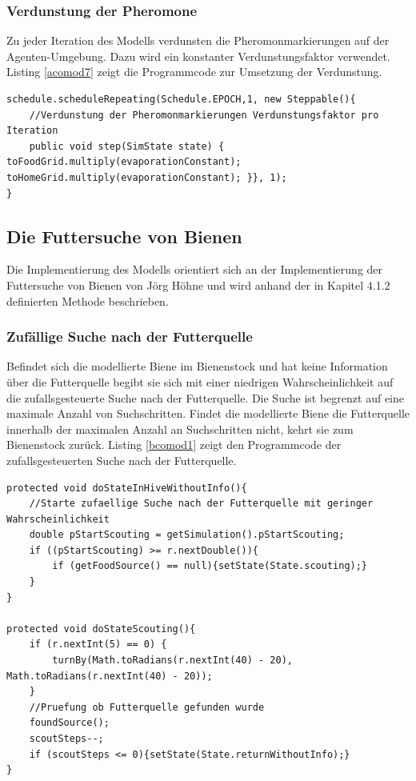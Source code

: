 \documentclass[a4paper, 11pt]{article}
\begin{document}
\subsubsection{Verdunstung der Pheromone}
Zu jeder Iteration des Modells verdunsten die Pheromonmarkierungen auf der Agenten-Umgebung. Dazu wird ein konstanter Verdunstungsfaktor verwendet. Listing \ref{acomod7} zeigt die Programmcode zur Umsetzung der Verdunstung.\newline
\begin{lstlisting}[caption= Ameisen: Verdunstung der Pheromone,label = acomod7]
schedule.scheduleRepeating(Schedule.EPOCH,1, new Steppable(){
	//Verdunstung der Pheromonmarkierungen Verdunstungsfaktor pro Iteration
	public void step(SimState state) { toFoodGrid.multiply(evaporationConstant); toHomeGrid.multiply(evaporationConstant); }}, 1);
}
\end{lstlisting}

\subsection{Die Futtersuche von Bienen}
Die Implementierung des Modells orientiert sich an der Implementierung der Futtersuche von Bienen von Jörg Höhne und wird anhand der in Kapitel 4.1.2 definierten Methode beschrieben.
\subsubsection{Zufällige Suche nach der Futterquelle}
Befindet sich die modellierte Biene im Bienenstock und hat keine Information über die Futterquelle begibt sie sich mit einer niedrigen Wahrscheinlichkeit auf die zufallsgesteuerte Suche nach der Futterquelle. Die Suche ist begrenzt auf eine maximale Anzahl von Suchschritten. Findet die modellierte Biene die Futterquelle innerhalb der maximalen Anzahl an Suchschritten nicht, kehrt sie zum Bienenstock zurück. Listing \ref{bcomod1} zeigt den Programmcode der zufallsgesteuerten Suche nach der Futterquelle.\newline
\begin{lstlisting}[caption= Bienen: Zufällige Suche nach der Futterquelle,label = bcomod1]
protected void doStateInHiveWithoutInfo(){
	//Starte zufaellige Suche nach der Futterquelle mit geringer Wahrscheinlichkeit
	double pStartScouting = getSimulation().pStartScouting;
	if ((pStartScouting) >= r.nextDouble()){
		if (getFoodSource() == null){setState(State.scouting);}
	}
}

protected void doStateScouting(){
	if (r.nextInt(5) == 0) {
		turnBy(Math.toRadians(r.nextInt(40) - 20), Math.toRadians(r.nextInt(40) - 20));
	}
	//Pruefung ob Futterquelle gefunden wurde
	foundSource();
	scoutSteps--;
	if (scoutSteps <= 0){setState(State.returnWithoutInfo);}
}
\end{lstlisting}
\newpage
\end{document}
